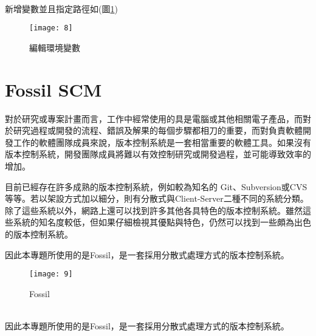\par
\\
\renewcommand{\baselinestretch}{1} %
\twelve \hspace{0.5em} 新增變數並且指定路徑如(圖\ref{fig.編輯環境變數})
\\
\par
\renewcommand{\baselinestretch}{1.7} %
\begin{figure}[hbt!]
\begin{center}
\texttt{[image: 8]}
\caption{\large 編輯環境變數}\label{fig.編輯環境變數}
\end{center}
\end{figure}
\par

\renewcommand{\baselinestretch}{20} %
\section{Fossil SCM}
\par
\renewcommand{\baselinestretch}{1} %
\twelve \qquad 對於研究或專案計畫而言，工作中經常使用的具是電腦或其他相關電子產品，而對於研究過程或開發的流程、錯誤及解果的每個步驟都相刀的重要，而對負責軟體開發工作的軟體團隊成員來說，版本控制系統是一套相當重要的軟體工具。如果沒有版本控制系統，開發團隊成員將難以有效控制研究或開發過程，並可能導致效率的增加。
\\
\par
\renewcommand{\baselinestretch}{1} %
\twelve \hspace{0.5em} 目前已經存在許多成熟的版本控制系統，例如較為知名的 Git、Subversion或CVS等等。若以架設方式加以細分，則有分散式與Client-Server二種不同的系統分類。除了這些系統以外，網路上還可以找到許多其他各具特色的版本控制系統。雖然這些系統的知名度較低，但如果仔細檢視其優點與特色，仍然可以找到一些頗為出色的版本控制系統。
\\
\par
\renewcommand{\baselinestretch}{1} %
\twelve \hspace{0.5em} 因此本專題所使用的是Fossil，是一套採用分散式處理方式的版本控制系統。
\\
\par
\renewcommand{\baselinestretch}{1.7} %
\begin{figure}[hbt!]
\begin{center}
\texttt{[image: 9]}
\caption{\large Fossil}\label{fig.Fossil}
\end{center}
\end{figure}
\par
\\
\renewcommand{\baselinestretch}{1} %
\twelve \hspace{0.5em} 因此本專題所使用的是Fossil，是一套採用分散式處理方式的版本控制系統。
\par

